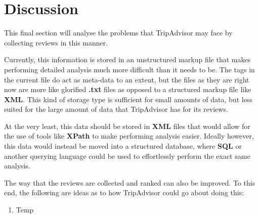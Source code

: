 \documentclass{article}
\begin{document}
	\newpage
	\section{Discussion}
	This final section will analyse the problems that TripAdvisor may face by collecting reviews in this manner. \newline
	
	\noindent
	Currently, this information is stored in an unstructured markup file that makes performing detailed analysis much more difficult than it needs to be. The tags in the current file do act as meta-data to an extent, but the files as they are right now are more like glorified \textbf{.txt} files as opposed to a structured markup file like \textbf{XML}. This kind of storage type is sufficient for small amounts of data, but less suited for the large amount of data that TripAdvisor has for its reviews. \newline
	
	\noindent
	At the very least, this data should be stored in \textbf{XML} files that would allow for the use of tools like \textbf{XPath} to make performing analysis easier. Ideally however, this data would instead be moved into a structured database, where \textbf{SQL} or another querying language could be used to effortlessly perform the exact same analysis. \newline
	
	\noindent
	The way that the reviews are collected and ranked can also be improved. To this end, the following are ideas as to how TripAdvisor could go about doing this:
	
	\begin{enumerate}
		\item Temp
	\end{enumerate}
	
\end{document}

